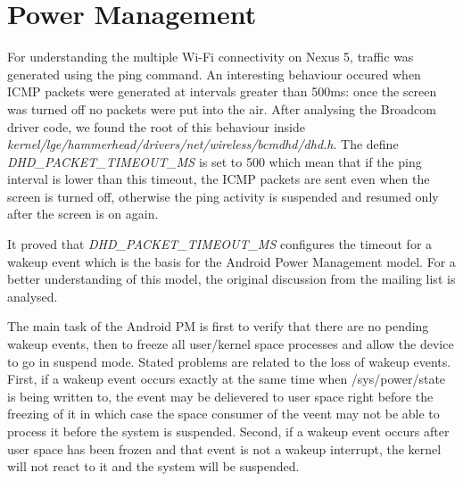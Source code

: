 

\section{Power Management}
\label{sec:PowerManagement}

For understanding the multiple Wi-Fi connectivity on Nexus 5, traffic was generated using the ping command. An interesting behaviour occured when ICMP packets were generated at intervals greater than 500ms: once the screen was turned off no packets were put into the air. After analysing the Broadcom driver code, we found the root of this behaviour inside \textit{kernel/lge/hammerhead/drivers/net/wireless/bcmdhd/dhd.h}. The define \textit{DHD_PACKET_TIMEOUT_MS} is set to 500 which mean that if the ping interval is lower than this timeout, the ICMP packets are sent even when the screen is turned off, otherwise the ping activity is suspended and resumed only after the screen is on again. 

It proved that \textit{DHD_PACKET_TIMEOUT_MS} configures the timeout for a wakeup event which is the basis for the Android Power Management model. For a better understanding of this model, the original discussion from the mailing list \cite{cite-wakesdiscussion} is analysed.

The main task of the Android PM is first to verify that there are no pending wakeup events, then to freeze all user/kernel space processes and allow the device to go in suspend mode. Stated problems are related to the loss of wakeup events. First, if a wakeup event occurs exactly at the same time when /sys/power/state is being written to, the event may be delievered to user space right before the freezing of it in which case the space consumer of the veent may not be able to process it before the system is suspended. Second, if a wakeup event occurs after user space has been frozen and that event is not a wakeup interrupt, the kernel will not react to it and the system will be suspended.


